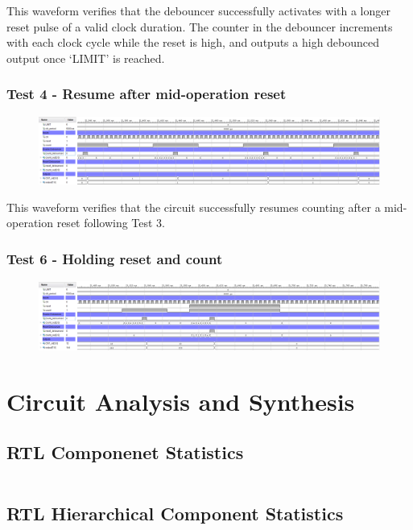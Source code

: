 \documentclass[11pt]{report}
\begin{document}
This waveform verifies that the debouncer successfully activates with a longer reset pulse of a valid clock duration. The counter in the debouncer increments with each clock cycle while the reset is high, and outputs a high debounced output once `LIMIT' is reached.

\subsubsection*{Test 4 - Resume after mid-operation reset}
\begin{figure}[H]
    \includegraphics[width=\columnwidth]{Waveforms/07_resume-after-mid-operation-reset.png}
\end{figure}
This waveform verifies that the circuit successfully resumes counting after a mid-operation reset following Test 3.

\subsubsection*{Test 6 - Holding reset and count}
\begin{figure}[H]
    \includegraphics[width=\columnwidth]{Waveforms/08_holding-reset-and-count.png}
\end{figure}




\section*{Circuit Analysis and Synthesis}

\subsection*{RTL Componenet Statistics}
\inputminted[firstline=65,lastline=76]{text}{../../Lab1/Lab1.runs/synth_1/fibonacci_8bit_sequence.vds}

\subsection*{RTL Hierarchical Component Statistics}
\inputminted[firstline=83,lastline=107]{text}{../../Lab1/Lab1.runs/synth_1/fibonacci_8bit_sequence.vds}
\end{document}
